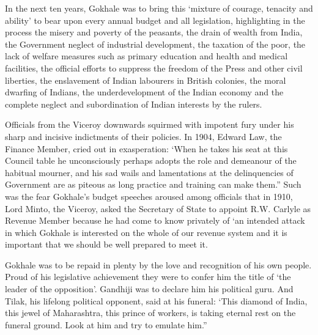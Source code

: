 In the next ten years, Gokhale was to bring this ‘mixture of courage, tenacity and ability’ to bear upon every annual budget and all legislation, highlighting in the process the misery and poverty of the peasants, the drain of wealth from India, the Government neglect of industrial development, the taxation of the poor, the lack of welfare measures such as primary education and health and medical facilities, the official efforts to suppress the freedom of the Press and other civil liberties, the enslavement of Indian labourers in British colonies, the moral dwarfing of Indians, the underdevelopment of the Indian economy and the complete neglect and subordination of Indian interests by the rulers.

Officials from the Viceroy downwards squirmed with impotent fury under his sharp and incisive indictments of their policies. In 1904, Edward Law, the Finance Member, cried out in exasperation: ‘When he takes his seat at this Council table he unconsciously perhaps adopts the role and demeanour of the habitual mourner, and his sad wails and lamentations at the delinquencies of Government are as piteous as long practice and training can make them.” Such was the fear Gokhale’s budget speeches aroused among officials that in 1910, Lord Minto, the Viceroy, asked the Secretary of State to appoint R.W. Carlyle as Revenue Member because he had come to know privately of ‘an intended attack in which Gokhale is interested on the whole of our revenue system and it is important that we should be well prepared to meet it.

Gokhale was to be repaid in plenty by the love and recognition of his own people. Proud of his legislative achievement they were to confer him the title of ‘the leader of the opposition’. Gandhiji was to declare him his political guru. And Tilak, his lifelong political opponent, said at his funeral: ‘This diamond of India, this jewel of Maharashtra, this prince of workers, is taking eternal rest on the funeral ground. Look at him and try to emulate him.”
